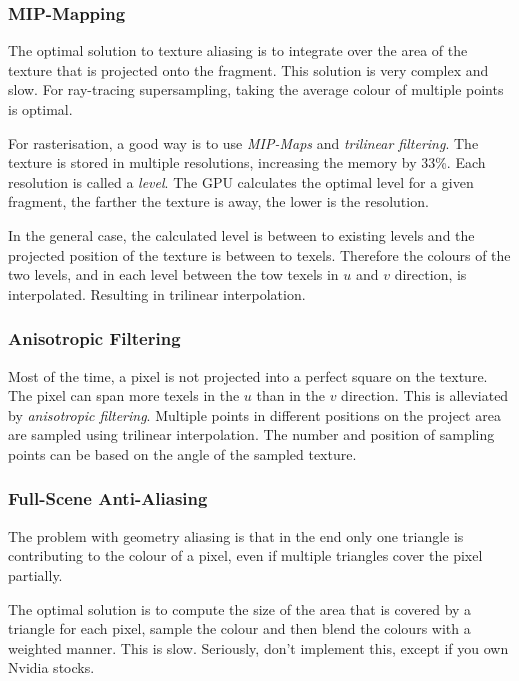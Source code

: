 \documentclass[english]{panikzettel}
\begin{document}
\subsubsection*{MIP-Mapping}

The optimal solution to texture aliasing is to integrate over the area of the texture that is projected onto the fragment. This solution is very complex and slow. For ray-tracing supersampling, taking the average colour of multiple points is optimal.

For rasterisation, a good way is to use \emph{MIP-Maps} and \emph{trilinear filtering}. The texture is stored in multiple resolutions, increasing the memory by 33\%. Each resolution is called a \emph{level}. The GPU calculates the optimal level for a given fragment, the farther the texture is away, the lower is the resolution.

In the general case, the calculated level is between to existing levels and the projected position of the texture is between to texels. Therefore the colours of the two levels, and in each level between the tow texels in $u$ and $v$ direction, is interpolated. Resulting in trilinear interpolation.

\subsubsection*{Anisotropic Filtering}

Most of the time, a pixel is not projected into a perfect square on the texture. The pixel can span more texels in the $u$ than in the $v$ direction. This is alleviated by \emph{anisotropic filtering}. Multiple points in different positions on the project area are sampled using trilinear interpolation. The number and position of sampling points can be based on the angle of the sampled texture.

\subsubsection*{Full-Scene Anti-Aliasing}

The problem with geometry aliasing is that in the end only one triangle is contributing to the colour of a pixel, even if multiple triangles cover the pixel partially.

The optimal solution is to compute the size of the area that is covered by a triangle for each pixel, sample the colour and then blend the colours with a weighted manner. This is slow. Seriously, don't implement this, except if you own Nvidia stocks.
\end{document}
